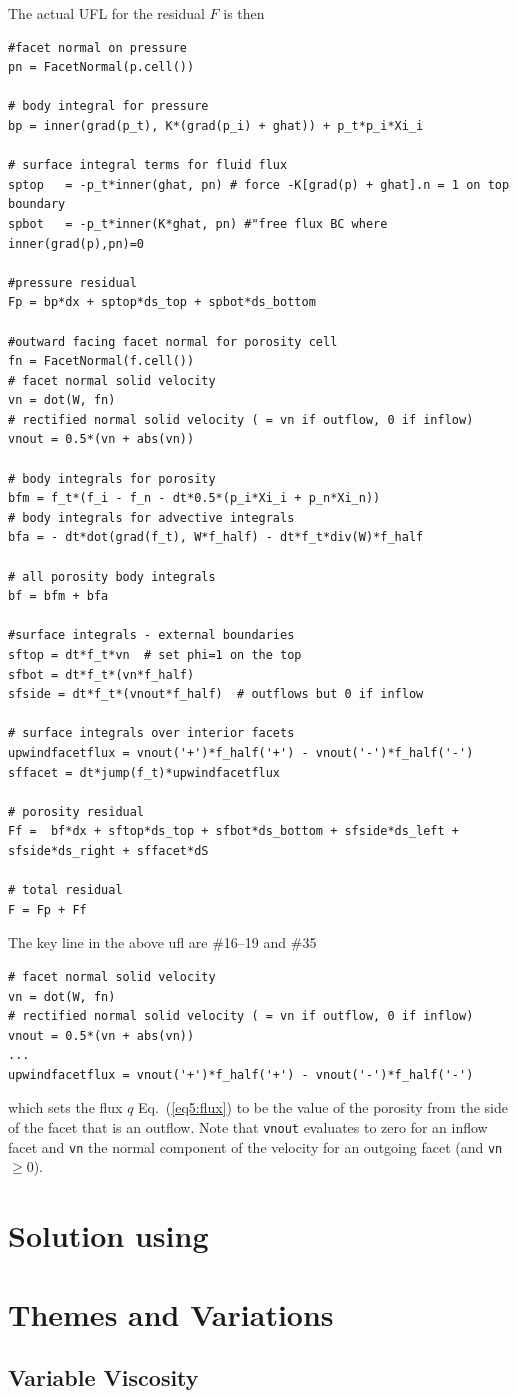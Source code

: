 The actual UFL for the residual $F$ is then
\begin{lstlisting}[style=UFL]
#facet normal on pressure
pn = FacetNormal(p.cell())

# body integral for pressure
bp = inner(grad(p_t), K*(grad(p_i) + ghat)) + p_t*p_i*Xi_i 

# surface integral terms for fluid flux 
sptop   = -p_t*inner(ghat, pn) # force -K[grad(p) + ghat].n = 1 on top boundary
spbot   = -p_t*inner(K*ghat, pn) #"free flux BC where inner(grad(p),pn)=0

#pressure residual
Fp = bp*dx + sptop*ds_top + spbot*ds_bottom

#outward facing facet normal for porosity cell
fn = FacetNormal(f.cell())
# facet normal solid velocity
vn = dot(W, fn)
# rectified normal solid velocity ( = vn if outflow, 0 if inflow)
vnout = 0.5*(vn + abs(vn))

# body integrals for porosity
bfm = f_t*(f_i - f_n - dt*0.5*(p_i*Xi_i + p_n*Xi_n))
# body integrals for advective integrals
bfa = - dt*dot(grad(f_t), W*f_half) - dt*f_t*div(W)*f_half

# all porosity body integrals
bf = bfm + bfa

#surface integrals - external boundaries
sftop = dt*f_t*vn  # set phi=1 on the top
sfbot = dt*f_t*(vn*f_half)
sfside = dt*f_t*(vnout*f_half)  # outflows but 0 if inflow

# surface integrals over interior facets
upwindfacetflux = vnout('+')*f_half('+') - vnout('-')*f_half('-')
sffacet = dt*jump(f_t)*upwindfacetflux

# porosity residual
Ff =  bf*dx + sftop*ds_top + sfbot*ds_bottom + sfside*ds_left + sfside*ds_right + sffacet*dS

# total residual
F = Fp + Ff
\end{lstlisting}

\pagebreak{}
The key line in the above ufl are \#16--19 and  \#35
\begin{lstlisting}[style=UFL]
# facet normal solid velocity
vn = dot(W, fn)
# rectified normal solid velocity ( = vn if outflow, 0 if inflow)
vnout = 0.5*(vn + abs(vn))
...
upwindfacetflux = vnout('+')*f_half('+') - vnout('-')*f_half('-')
\end{lstlisting}
which sets the flux $q$ Eq.\ (\ref{eq5:flux}) to be the value of the
porosity from the side of the facet that is an outflow.  Note that
\texttt{vnout} evaluates to zero for an inflow facet and \texttt{vn}
the normal component of the velocity for an outgoing facet (and
\texttt{vn}$\geq 0$).

\section{Solution using \TF}
\label{sec:solution-using-tf}



\section{Themes and Variations}
\label{sec:themes-variations}


\subsection{Variable Viscosity}
\label{sec:variable-viscosity}


